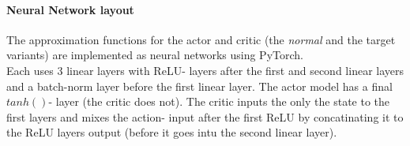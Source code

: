 \documentclass[a4paper]{article}
\begin{document}
\paragraph{Neural Network layout}
The approximation functions for the actor and critic (the \textit{normal}
and the target variants) are implemented as neural networks using PyTorch.
\\
Each uses 3 linear layers with ReLU- layers after the first and second linear
layers and a batch-norm layer before the first linear layer.
The actor model has a final $tanh()$- layer (the critic does not).
The critic inputs the only the state to the first layers and mixes the action-
input after the first ReLU by concatinating it to the ReLU layers output
(before it goes intu the second linear layer).
\\
\end{document}
